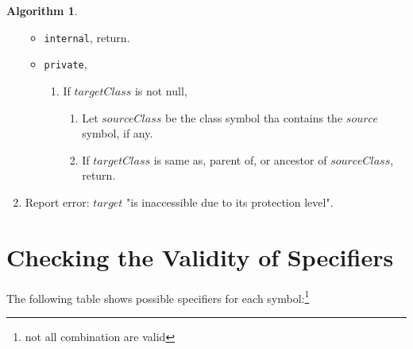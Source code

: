 \documentclass[a4paper,oneside,11pt]{book}
\theoremstyle{definition}
\newtheorem{algo}{Algorithm}[section]
\begin{document}
\begin{algo}
\begin{enumerate}
\begin{itemize}
\begin{enumerate}
\end{enumerate}
\item
\verb|internal|, return.
\item
\verb|private|,
\begin{enumerate}
\item
If $targetClass$ is not null,
\begin{enumerate}
\item
Let $sourceClass$ be the class symbol tha contains the $source$ symbol, if any.
\item
If $targetClass$ is same as, parent of, or ancestor of $sourceClass$, return.
\end{enumerate}
\end{enumerate}
\end{itemize}
\item
Report error: $target$ "is inaccessible due to its protection level".
\end{enumerate}
\end{algo}

\section{Checking the Validity of Specifiers}

The following table shows possible specifiers for each symbol:\footnote{not all combination are valid}
\end{document}
